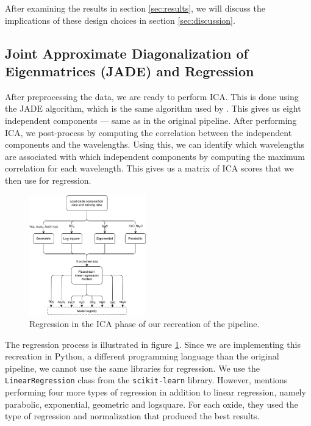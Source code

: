 After examining the results in section \ref{sec:results}, we will discuss the implications of these design choices in section \ref{sec:discussion}.

\subsection{Joint Approximate Diagonalization of Eigenmatrices (JADE) and Regression}
After preprocessing the data, we are ready to perform ICA.
This is done using the JADE algorithm, which is the same algorithm used by \citeauthor{cleggRecalibrationMarsScience2017}.
This gives us eight independent components --- same as in the original pipeline.
After performing ICA, we post-process by computing the correlation between the independent components and the wavelengths.
Using this, we can identify which wavelengths are associated with which independent components by computing the maximum correlation for each wavelength.
This gives us a matrix of ICA scores that we then use for regression.

\begin{figure}
	\centering
	\includegraphics[width=0.45\textwidth]{images/ica_regression.png}
	\caption{Regression in the ICA phase of our recreation of the pipeline.}
	\label{fig:ica_regression}
\end{figure}

The regression process is illustrated in figure \ref{fig:ica_regression}.
Since we are implementing this recreation in Python, a different programming language than the original pipeline, we cannot use the same libraries for regression.
We use the \texttt{LinearRegression} class from the \texttt{scikit-learn} library\cite{scikit-learn}.
However, \citeauthor{cleggRecalibrationMarsScience2017} mentions performing four more types of regression in addition to linear regression, namely parabolic, exponential, geometric and logsquare.
For each oxide, they used the type of regression and normalization that produced the best results.

